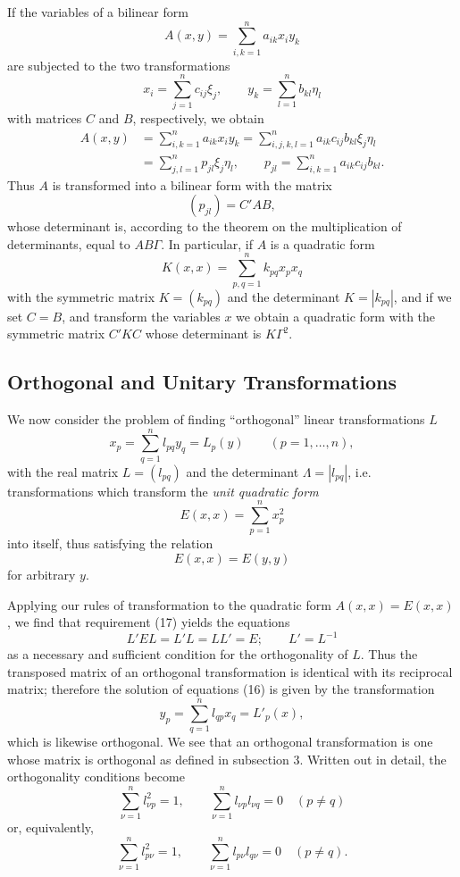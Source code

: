If the variables of a bilinear form
\[
A(x,y)=\sum_{i,k=1}^{n}a_{ik}x_i y_k
\]
are subjected to the two transformations
\[
x_i=\sum_{j=1}^{n}c_{ij}\xi_j,
\qquad
y_k=\sum_{l=1}^{n}b_{kl}\eta_l
\]
with matrices $C$ and $B$, respectively, we obtain
\[
\begin{aligned}
A(x,y)
&=\sum_{i,k=1}^{n}a_{ik}x_i y_k
=\sum_{i,j,k,l=1}^{n}a_{ik}c_{ij}b_{kl}\xi_j\eta_l\\
&=\sum_{j,l=1}^{n}p_{jl}\xi_j\eta_l,
\qquad p_{jl}=\sum_{i,k=1}^{n}a_{ik}c_{ij}b_{kl}.
\end{aligned}
\]
Thus $A$ is transformed into a bilinear form with the matrix
\[
(p_{jl})=C'AB,
\]
whose determinant is, according to the theorem on the multiplication of determinants, equal to $AB\Gamma$. In particular, if $A$ is a quadratic form
\[
K(x,x)=\sum_{p,q=1}^{n}k_{pq}x_p x_q
\]
with the symmetric matrix $K=(k_{pq})$ and the determinant $K=|k_{pq}|$, and if we set $C=B$, and transform the variables $x$ we obtain a quadratic form with the symmetric matrix $C'KC$ whose determinant is $K\Gamma^2$.

\subsection{Orthogonal and Unitary Transformations}
We now consider the problem of finding ``orthogonal'' linear transformations $L$
\begin{equation*}
x_p=\sum_{q=1}^{n}l_{pq}y_q=L_p(y)\qquad(p=1,\ldots,n),
\tag{16}
\end{equation*}
with the real matrix $L=(l_{pq})$ and the determinant $\Lambda=|l_{pq}|$, i.e. transformations which transform the \emph{unit quadratic form}
\[
E(x,x)=\sum_{p=1}^{n}x_p^2
\]
into itself, thus satisfying the relation
\begin{equation*}
E(x,x)=E(y,y)
\tag{17}
\end{equation*}
for arbitrary $y$.

Applying our rules of transformation to the quadratic form $A(x,x)=E(x,x)$, we find that requirement (17) yields the equations
\begin{equation*}
L'EL=L'L=LL'=E;\qquad L'=L^{-1}
\tag{18}
\end{equation*}
as a necessary and sufficient condition for the orthogonality of $L$. Thus the transposed matrix of an orthogonal transformation is identical with its reciprocal matrix; therefore the solution of equations (16) is given by the transformation
\begin{equation*}
y_p=\sum_{q=1}^{n}l_{qp}x_q=L'_p(x),
\tag{19}
\end{equation*}
which is likewise orthogonal. We see that an orthogonal transformation is one whose matrix is orthogonal as defined in subsection 3. Written out in detail, the orthogonality conditions become
\begin{equation*}
\sum_{\nu=1}^{n}l_{\nu p}^{2}=1,
\qquad
\sum_{\nu=1}^{n}l_{\nu p}l_{\nu q}=0\quad(p\ne q)
\tag{20}
\end{equation*}
or, equivalently,
\begin{equation*}
\sum_{\nu=1}^{n}l_{p\nu}^{2}=1,
\qquad
\sum_{\nu=1}^{n}l_{p\nu}l_{q\nu}=0\quad(p\ne q).
\tag{21}
\end{equation*}

